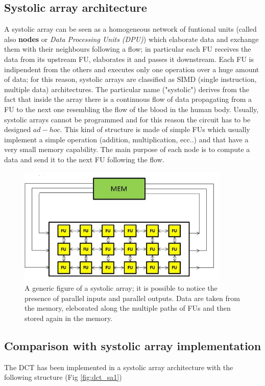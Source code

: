  \subsection{Systolic array architecture}
A systolic array can be seen as a homogeneous network of funtional units (called also \textbf{nodes} or \textit{Data Processing Units (DPU)}) which elaborate data and exchange them with their neighbours following a flow; in particular each FU receives the data from its upstream FU, elaborates it and passes it downstream. 
Each FU is indipendent from the others and executes only one operation over a huge amount of data; for this reason, systolic arrays are classified as SIMD (single instruction, multiple data) architectures. 
The particular name ("systolic") derives from the fact that inside the array there is a continuous flow of data propagating from a FU to the next one resembling the flow of the blood in the human body.
Usually, systolic arrays cannot be programmed and for this reason the circuit has to be designed $ ad-hoc $. This kind of structure is made of simple FUs which usually implement a simple operation (addition, multiplication, ecc..) and that have a very small memory capability. The main purpose of each node is to compute a data and send it to the next FU following the flow. 

\begin{figure}[h!]
	\centering	
	\includegraphics[width=0.9\textwidth]{imm/dct/dct_sa0.png}  
	\caption{ A generic figure of a systolic array; it is possible to notice the presence of parallel inputs and parallel outputs. Data are taken from the memory, eleborated along the multiple paths of FUs and then stored again in the memory.
		} 
	\label{fig:dct_sa0}
\end{figure}
\clearpage
 \subsection{Comparison with systolic array implementation}  \label{DCTSA}
 The DCT has been implemented in a systolic array architecture with the following structure (Fig \ref{fig:dct_sa1})
 
